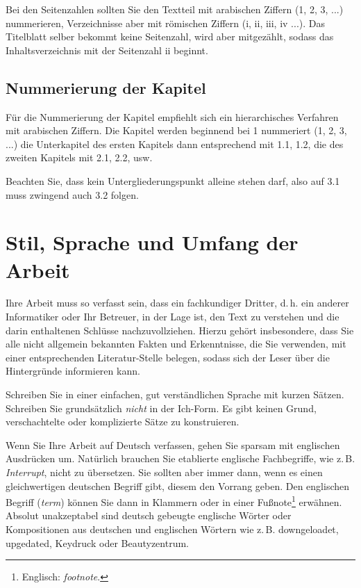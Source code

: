 \documentclass[a4paper,11pt,headings=normal]{scrartcl}
\begin{document}
Bei den Seitenzahlen sollten Sie den Textteil mit arabischen Ziffern (1, 2, 3, ...) nummerieren, Verzeichnisse aber mit römischen Ziffern (i, ii, iii, iv ...). Das Titelblatt selber bekommt keine Seitenzahl, wird aber mitgezählt, sodass das Inhaltsverzeichnis mit der Seitenzahl ii beginnt.

\subsection{Nummerierung der Kapitel}
Für die Nummerierung der Kapitel empfiehlt sich ein hierarchisches Verfahren mit arabischen Ziffern. Die Kapitel werden beginnend bei 1 nummeriert (1, 2, 3, ...) die Unterkapitel des ersten Kapitels dann entsprechend mit 1.1, 1.2, die des zweiten Kapitels mit 2.1, 2.2, usw.

Beachten Sie, dass kein Untergliederungspunkt alleine stehen darf, also auf 3.1 muss zwingend auch 3.2 folgen.

\section{Stil, Sprache und Umfang der Arbeit}
Ihre Arbeit muss so verfasst sein, dass ein fachkundiger Dritter, d.\,h. ein anderer Informatiker oder Ihr Betreuer, in der Lage ist, den Text zu verstehen und die darin enthaltenen Schlüsse nachzuvollziehen. Hierzu gehört insbesondere, dass Sie alle nicht allgemein bekannten Fakten und Erkenntnisse, die Sie verwenden, mit einer entsprechenden Literatur-Stelle belegen, sodass sich der Leser über die Hintergründe informieren kann.

Schreiben Sie in einer einfachen, gut verständlichen Sprache mit kurzen Sätzen. Schreiben Sie grundsätzlich \textit{nicht} in der Ich-Form. Es gibt keinen Grund, verschachtelte oder komplizierte Sätze zu konstruieren. 

Wenn Sie Ihre Arbeit auf Deutsch verfassen, gehen Sie sparsam mit englischen Ausdrücken um. Natürlich brauchen Sie etablierte englische Fachbegriffe, wie z.\,B. \textit{Interrupt}, nicht zu übersetzen. Sie sollten aber immer dann, wenn es einen gleichwertigen deutschen Begriff gibt, diesem den Vorrang geben. Den englischen Begriff (\textit{term}) können Sie dann in Klammern oder in einer Fußnote\footnote{Englisch: \textit{footnote}.} erwähnen. Absolut unakzeptabel sind deutsch gebeugte englische Wörter oder Kompositionen aus deutschen und englischen Wörtern wie z.\,B. downgeloadet, upgedated, Keydruck oder Beautyzentrum. 
\end{document}
